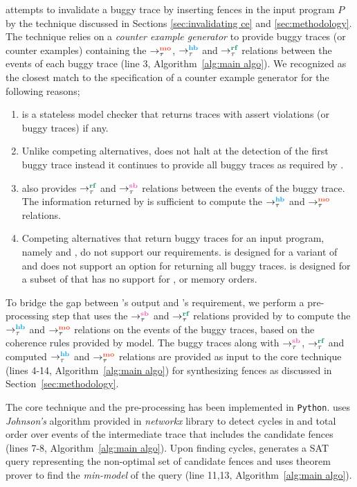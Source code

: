 \ourtechnique attempts to invalidate a buggy trace 
by inserting \cc fences in the input program $P$
by the technique discussed in Sections
\ref{sec:invalidating ce} and \ref{sec:methodology}.
%
The technique relies on a {\em counter example generator} 
to provide buggy traces (or counter examples) containing
the $\setMO$, $\setHB$ and $\setRF$ relations between the 
events of each buggy trace (line 3, 
Algorithm~\ref{alg:main algo}).
%
We recognized \cds \cite{cds} as the closest match to the
specification of a counter example generator
for the following reasons;

\begin{enumerate}
	\item \cds is a stateless model checker that returns traces 
		with assert violations (or buggy traces) if any.
	
	\item Unlike competing alternatives, \cds does not halt at the detection 
		of the first buggy trace instead it continues to provide all buggy 
		traces as required by \ourtechnique.
	
	\item \cds also provides $\setRF$ and $\setSB$ relations between the events 
		of the buggy trace. The information returned by \cds is sufficient
		to compute the $\setHB$ and $\setMO$ relations.
	
	\item Competing alternatives that return buggy traces for an input
		program, namely \genmc \cite{genmc-PLDI19} and \tracer \cite{tracer2018}, 
		do not support our requirements.
		\genmc is designed for a variant of \cc \cite{LahavVafeiadis-PLDI17} and
		does not support an option for returning all buggy traces. \tracer is
		designed for a subset of \cc that has no support for \sc, \na or \rel 
		memory orders. 
\end{enumerate}

To bridge the gap between \cds's output and \ourtechnique's requirement,
we perform a pre-processing step that uses the $\setSB$ and $\setRF$ relations 
provided by \cds to compute the $\setHB$ and $\setMO$ relations on the events
of the buggy traces, based on the coherence rules provided by \cc model.
%
The buggy traces along with $\setSB$, $\setRF$ and computed $\setHB$ 
and $\setMO$ relations are provided as input to the core technique 
(lines 4-14, Algorithm~\ref{alg:main algo}) for synthesizing fences as
discussed in Section~\ref{sec:methodology}.

The core technique and the pre-processing has been implemented in 
{\tt Python}.
\ourtechnique uses {\em Johnson's} algorithm provided in {\em networkx}
library to detect cycles in  and
\sc total order over 
events of the intermediate trace that includes the 
candidate fences (lines 7-8, Algorithm~\ref{alg:main algo}).
%
Upon finding cycles, \ourtechnique generates a SAT query 
representing the non-optimal set of candidate fences and
uses \z theorem prover to find the {\em min-model} of the 
query (line 11,13, Algorithm~\ref{alg:main algo}).

